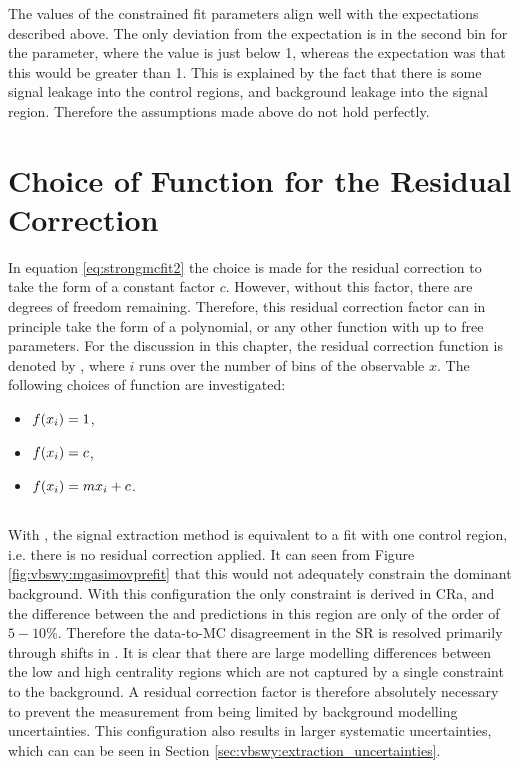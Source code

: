 The values of the constrained fit parameters align well with the expectations described above. The only deviation from the expectation is in the second bin for the \bl parameter, where the value is just below 1, whereas the expectation was that this would be greater than 1. This is explained by the fact that there is some signal leakage into the control regions, and background leakage into the signal region. Therefore the assumptions made above do not hold perfectly. 

\section{Choice of Function for the Residual Correction}\label{sec:vbswy:fxchoice}

In equation \ref{eq:strongmcfit2} the choice is made for the residual correction to take the form of a constant factor $c$. However, without this factor, there are \nbins degrees of freedom remaining. Therefore, this residual correction factor can in principle take the form of a polynomial, or any other function with up to \nbins free parameters. For the discussion in this chapter, the residual correction function is denoted by \fx, where $i$ runs over the number of bins of the observable $x$. The following choices of function are investigated:
\begin{itemize}
  \item $f(x_i)=1$,
  \item $f(x_i)=c$,
  \item $f(x_i)=mx_i+c$.
\end{itemize}

\subsection{}

With , the signal extraction method is equivalent to a fit with one control region, i.e. there is no residual correction applied. It can seen from Figure \ref{fig:vbswy:mgasimovprefit} that this would not adequately constrain the dominant background. With this configuration the only \qcdwy constraint is derived in CRa, and the difference between the \qcdwy \SHERPA and \MADGRAPH predictions in this region are only of the order of $5-10\%$. Therefore the data-to-MC disagreement in the SR is resolved primarily through shifts in \muew. It is clear that there are large modelling differences between the low and high centrality regions which are not captured by a single constraint to the \qcdwy background. A residual correction factor is therefore absolutely necessary to prevent the measurement from being limited by background modelling uncertainties. This configuration also results in larger systematic uncertainties, which can can be seen in Section \ref{sec:vbswy:extraction_uncertainties}.

